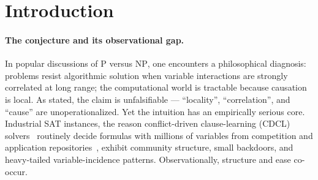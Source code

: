 \documentclass[manuscript, screen, review]{jair}
\begin{document}
\begin{abstract}
{\bf Conclusions:} Locality is not merely correlated with tractability ---
under our controls it behaves as the causal channel. All claims are scoped to
$n=400$, direct CNF encodings, and CDCL-family solvers; we discuss what this
does and does not say about P versus NP. Code, seeds, data, preregistration,
and the full audit trail are public.
\end{abstract}

\maketitle


\section{Introduction}
\label{sec:intro}

\paragraph{The conjecture and its observational gap.}
In popular discussions of \textsc{P} versus \textsc{NP}, one encounters a
philosophical diagnosis: problems resist algorithmic solution when variable
interactions are strongly correlated at long range; the computational world is
tractable because causation is local. As stated, the claim is unfalsifiable
--- ``locality'', ``correlation'', and ``cause'' are unoperationalized. Yet the
intuition has an empirically serious core. Industrial SAT instances, the
reason conflict-driven clause-learning (CDCL) solvers~\cite{marques2009}
routinely decide formulas with millions of variables from competition and
application repositories~\cite{satcomp}, exhibit community structure, small
backdoors, and heavy-tailed variable-incidence patterns. Observationally,
structure and ease co-occur.
\end{document}
